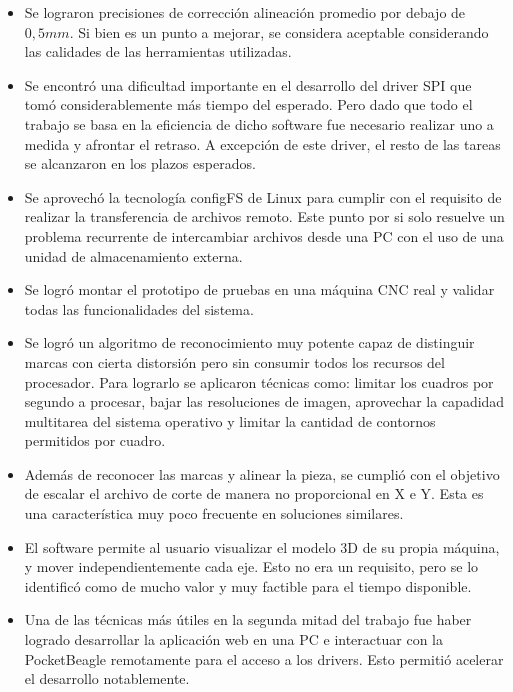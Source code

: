 \begin{itemize}
   \item{Se lograron precisiones de corrección alineación promedio por debajo de $0,5mm$. Si bien es un punto a mejorar, se considera aceptable considerando las calidades de las herramientas utilizadas.}

   \item{Se encontró una dificultad importante en el desarrollo del driver SPI que tomó considerablemente más tiempo del esperado. Pero dado que todo el trabajo se basa en la eficiencia de dicho software fue necesario realizar uno a medida y afrontar el retraso. A excepción de este driver, el resto de las tareas se alcanzaron en los plazos esperados.}
   
   \item{Se aprovechó la tecnología configFS de Linux para cumplir con el requisito de realizar la transferencia de archivos remoto. Este punto por si solo resuelve un problema recurrente de intercambiar archivos desde una PC con el uso de una unidad de almacenamiento externa.}

   \item{Se logró montar el prototipo de pruebas en una máquina CNC real y validar todas las funcionalidades del sistema.}

   \item{Se logró un algoritmo de reconocimiento muy potente capaz de distinguir marcas con cierta distorsión pero sin consumir todos los recursos del procesador.  Para lograrlo se aplicaron técnicas como: limitar los cuadros por segundo a procesar, bajar las resoluciones de imagen, aprovechar la capadidad multitarea del sistema operativo y limitar la cantidad de contornos permitidos por cuadro.}

   \item{Además de reconocer las marcas y alinear la pieza, se cumplió con el objetivo de escalar el archivo de corte de manera no proporcional en X e Y. Esta es una característica muy poco frecuente en soluciones similares.}

   \item{El software permite al usuario visualizar el modelo 3D de su propia máquina, y mover independientemente cada eje. Esto no era un requisito, pero se lo identificó como de mucho valor y muy factible para el tiempo disponible.}

   \item{Una de las técnicas más útiles en la segunda mitad del trabajo fue haber logrado desarrollar la aplicación web en una PC e interactuar con la PocketBeagle remotamente para el acceso a los drivers. Esto permitió acelerar el desarrollo notablemente.}

\end{itemize}

